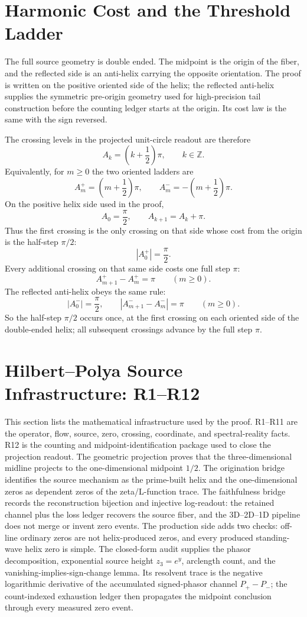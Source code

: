 \documentclass[11pt]{article}
\begin{document}
\section{Harmonic Cost and the Threshold Ladder}

The full source geometry is double ended.  The midpoint is the origin of the
fiber, and the reflected side is an anti-helix carrying the opposite orientation.
The proof is written on the positive oriented side of the helix; the reflected
anti-helix supplies the symmetric pre-origin geometry used for high-precision
tail construction before the counting ledger starts at the origin.  Its cost
law is the same with the sign reversed.

The crossing levels in the projected unit-circle readout are therefore
\[
  A_k=\left(k+\frac12\right)\pi,\qquad k\in\mathbb Z.
\]
Equivalently, for $m\ge0$ the two oriented ladders are
\[
  A_m^+=\left(m+\frac12\right)\pi,\qquad
  A_m^-=-\left(m+\frac12\right)\pi .
\]
On the positive helix side used in the proof,
\[
  A_0=\frac\pi2,\qquad A_{k+1}=A_k+\pi.
\]
Thus the first crossing is the only crossing on that side whose cost from the
origin is the half-step $\pi/2$:
\[
  |A_0^+|=\frac\pi2.
\]
Every additional crossing on that same side costs one full step $\pi$:
\[
  A_{m+1}^+-A_m^+=\pi\qquad(m\ge0).
\]
The reflected anti-helix obeys the same rule:
\[
  |A_0^-|=\frac\pi2,\qquad |A_{m+1}^- - A_m^-|=\pi\qquad(m\ge0).
\]
So the half-step $\pi/2$ occurs once, at the first crossing on each oriented
side of the double-ended helix; all subsequent crossings advance by the full
step $\pi$.

\section{Hilbert--Polya Source Infrastructure: R1--R12}

This section lists the mathematical infrastructure used by the proof.  R1--R11
are the operator, flow, source, zero, crossing, coordinate, and spectral-reality
facts.  R12 is the counting and midpoint-identification package used to close
the projection readout.  The geometric projection proves that the
three-dimensional midline projects to the one-dimensional midpoint $1/2$.
The origination bridge identifies the source mechanism as the prime-built helix
and the one-dimensional zeros as dependent zeros of the zeta/L-function trace.
The faithfulness bridge records the reconstruction bijection and injective log-readout:
the retained channel plus the loss ledger recovers the source fiber, and the
3D--2D--1D pipeline does not merge or invent zero events.  The production side
adds two checks: off-line ordinary zeros are not helix-produced zeros, and
every produced standing-wave helix zero is simple.  The closed-form audit
supplies the phasor decomposition, exponential source height $z_3=e^y$,
arclength count, and the vanishing-implies-sign-change lemma.  Its resolvent
trace is the negative logarithmic derivative of the accumulated signed-phasor
channel $P_+-P_-$; the count-indexed exhaustion ledger then propagates the
midpoint conclusion through every measured zero event.
\end{document}
